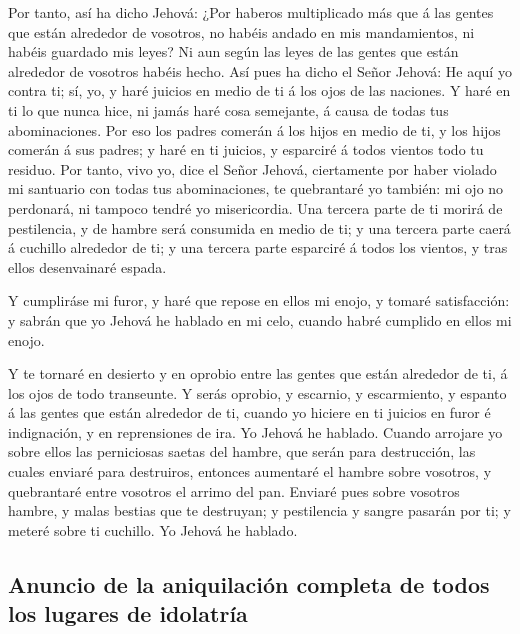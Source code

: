  Por tanto, así ha dicho Jehová: ¿Por haberos multiplicado
más que á las gentes que están alrededor de vosotros, no habéis andado
en mis mandamientos, ni habéis guardado mis leyes? Ni aun según las
leyes de las gentes que están alrededor de vosotros habéis hecho.
 Así pues ha dicho el Señor Jehová: He aquí yo contra ti;
sí, yo, y haré juicios en medio de ti á los ojos de las naciones.
 Y haré en ti lo que nunca hice, ni jamás haré cosa
semejante, á causa de todas tus abominaciones.  Por eso los
padres comerán á los hijos en medio de ti, y los hijos comerán á sus
padres; y haré en ti juicios, y esparciré á todos vientos todo tu
residuo.  Por tanto, vivo yo, dice el Señor Jehová,
ciertamente por haber violado mi santuario con todas tus abominaciones,
te quebrantaré yo también: mi ojo no perdonará, ni tampoco tendré yo
misericordia.  Una tercera parte de ti morirá de
pestilencia, y de hambre será consumida en medio de ti; y una tercera
parte caerá á cuchillo alrededor de ti; y una tercera parte esparciré á
todos los vientos, y tras ellos desenvainaré espada.

 Y cumpliráse mi furor, y haré que repose en ellos mi
enojo, y tomaré satisfacción: y sabrán que yo Jehová he hablado en mi
celo, cuando habré cumplido en ellos mi enojo.

 Y te tornaré en desierto y en oprobio entre las gentes que
están alrededor de ti, á los ojos de todo transeunte.  Y
serás oprobio, y escarnio, y escarmiento, y espanto á las gentes que
están alrededor de ti, cuando yo hiciere en ti juicios en furor é
indignación, y en reprensiones de ira. Yo Jehová he hablado.
 Cuando arrojare yo sobre ellos las perniciosas saetas del
hambre, que serán para destrucción, las cuales enviaré para destruiros,
entonces aumentaré el hambre sobre vosotros, y quebrantaré entre
vosotros el arrimo del pan.  Enviaré pues sobre vosotros
hambre, y malas bestias que te destruyan; y pestilencia y sangre pasarán
por ti; y meteré sobre ti cuchillo. Yo Jehová he hablado.

\hypertarget{anuncio-de-la-aniquilaciuxf3n-completa-de-todos-los-lugares-de-idolatruxeda}{%
\subsection{Anuncio de la aniquilación completa de todos los lugares de
idolatría}\label{anuncio-de-la-aniquilaciuxf3n-completa-de-todos-los-lugares-de-idolatruxeda}}


